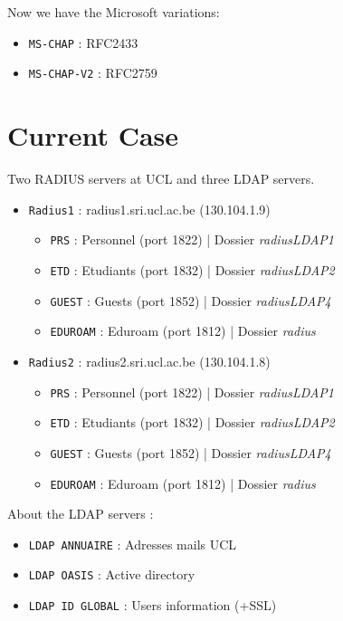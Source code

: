 \documentclass[10pt,a4paper]{article}
\begin{document}
Now we have the Microsoft variations:
\begin{itemize}
\item \texttt{MS-CHAP} : RFC2433
\item \texttt{MS-CHAP-V2} : RFC2759
\end{itemize}

\section{Current Case}
Two RADIUS servers at UCL and three LDAP servers.
\begin{itemize}
\item \texttt{Radius1} : radius1.sri.ucl.ac.be (130.104.1.9)
	\begin{itemize}
		\item \texttt{PRS} : Personnel (port 1822) | Dossier \textit{radiusLDAP1}
		\item \texttt{ETD} : Etudiants (port 1832) | Dossier \textit{radiusLDAP2}
		\item \texttt{GUEST} : Guests (port 1852) | Dossier \textit{radiusLDAP4}
		\item \texttt{EDUROAM} : Eduroam (port 1812) | Dossier \textit{radius}
	\end{itemize}
\item \texttt{Radius2} : radius2.sri.ucl.ac.be (130.104.1.8)
\begin{itemize}
		\item \texttt{PRS} : Personnel (port 1822) | Dossier \textit{radiusLDAP1}
		\item \texttt{ETD} : Etudiants (port 1832) | Dossier \textit{radiusLDAP2}
		\item \texttt{GUEST} : Guests (port 1852) | Dossier \textit{radiusLDAP4}
		\item \texttt{EDUROAM} : Eduroam (port 1812) | Dossier \textit{radius}
	\end{itemize}
\end{itemize}
About the LDAP servers :
\begin{itemize}
\item \texttt{LDAP ANNUAIRE} : Adresses mails UCL
\item \texttt{LDAP OASIS} : Active directory
\item \texttt{LDAP ID GLOBAL} : Users information (+SSL)
\end{itemize}
\end{document}
